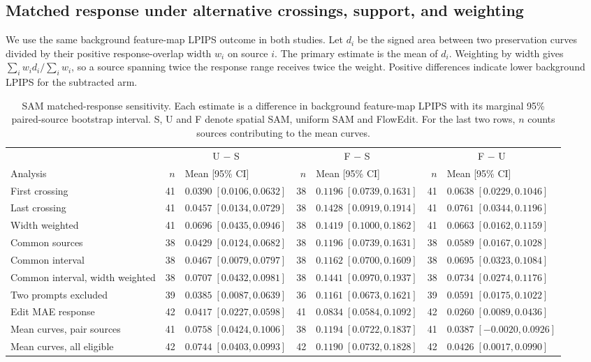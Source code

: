 \subsection{Matched response under alternative crossings, support, and weighting}
\label{sec:v20-mrc}
We use the same background feature-map LPIPS outcome in both studies. Let $d_i$ be the signed area between two preservation curves divided by their positive response-overlap width $w_i$ on source $i$. The primary estimate is the mean of $d_i$. Weighting by width gives $\sum_i w_i d_i/\sum_i w_i$, so a source spanning twice the response range receives twice the weight. Positive differences indicate lower background LPIPS for the subtracted arm.

\begin{table}[t]
\centering\footnotesize
\caption{SAM matched-response sensitivity. Each estimate is a difference in background feature-map LPIPS with its marginal 95\% paired-source bootstrap interval. S, U and F denote spatial SAM, uniform SAM and FlowEdit. For the last two rows, $n$ counts sources contributing to the mean curves.}
\label{tab:v20-mrc}
\setlength{\tabcolsep}{3pt}
\begin{tabular}{@{}lrlrlrl@{}}
\hline
 & \multicolumn{2}{c}{U $-$ S} & \multicolumn{2}{c}{F $-$ S} & \multicolumn{2}{c}{F $-$ U}\\
Analysis & $n$ & Mean [95\% CI] & $n$ & Mean [95\% CI] & $n$ & Mean [95\% CI]\\
\hline
First crossing & 41 & $0.0390\;[0.0106,0.0632]$ & 38 & $0.1196\;[0.0739,0.1631]$ & 41 & $0.0638\;[0.0229,0.1046]$\\
Last crossing & 41 & $0.0457\;[0.0134,0.0729]$ & 38 & $0.1428\;[0.0919,0.1914]$ & 41 & $0.0761\;[0.0344,0.1196]$\\
Width weighted & 41 & $0.0696\;[0.0435,0.0946]$ & 38 & $0.1419\;[0.1000,0.1862]$ & 41 & $0.0663\;[0.0162,0.1159]$\\
Common sources & 38 & $0.0429\;[0.0124,0.0682]$ & 38 & $0.1196\;[0.0739,0.1631]$ & 38 & $0.0589\;[0.0167,0.1028]$\\
Common interval & 38 & $0.0467\;[0.0079,0.0797]$ & 38 & $0.1162\;[0.0700,0.1609]$ & 38 & $0.0695\;[0.0323,0.1084]$\\
Common interval, width weighted & 38 & $0.0707\;[0.0432,0.0981]$ & 38 & $0.1441\;[0.0970,0.1937]$ & 38 & $0.0734\;[0.0274,0.1176]$\\
Two prompts excluded & 39 & $0.0385\;[0.0087,0.0639]$ & 36 & $0.1161\;[0.0673,0.1621]$ & 39 & $0.0591\;[0.0175,0.1022]$\\
Edit MAE response & 42 & $0.0417\;[0.0227,0.0598]$ & 41 & $0.0834\;[0.0584,0.1092]$ & 42 & $0.0260\;[0.0089,0.0436]$\\
Mean curves, pair sources & 41 & $0.0758\;[0.0424,0.1006]$ & 38 & $0.1194\;[0.0722,0.1837]$ & 41 & $0.0387\;[-0.0020,0.0926]$\\
Mean curves, all eligible & 42 & $0.0744\;[0.0403,0.0993]$ & 42 & $0.1190\;[0.0732,0.1828]$ & 42 & $0.0426\;[0.0017,0.0990]$\\
\hline
\end{tabular}
\end{table}


